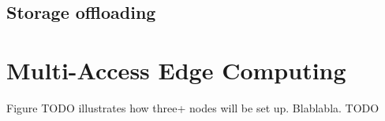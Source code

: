 \subsection{Storage offloading}













\section{Multi-Access Edge Computing}
Figure TODO illustrates how three+ nodes will be set up. Blablabla.
TODO



